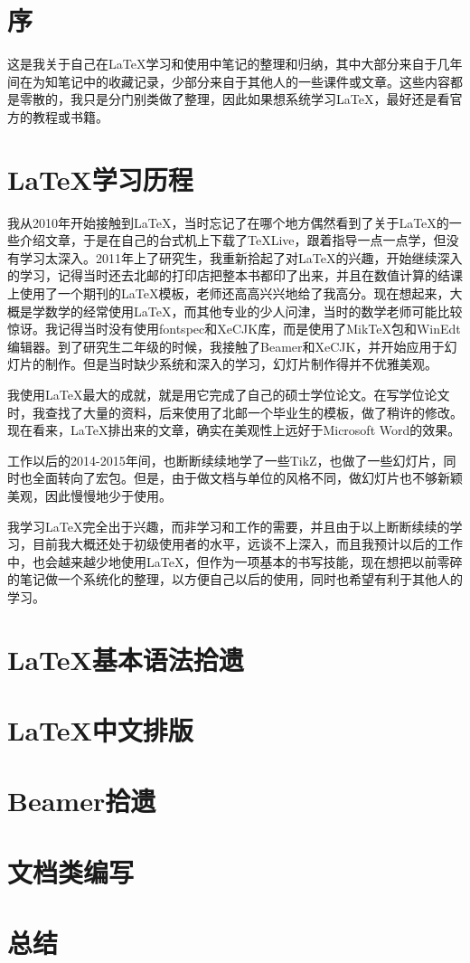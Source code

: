 \documentclass[11pt]{ctexart}
\title{\heiti{\LaTeX 总结}}
\author{\kaishu{北方以北}}
\begin{document}
\maketitle

\tableofcontents

\section{序}

这是我关于自己在\LaTeX 学习和使用中笔记的整理和归纳，其中大部分来自于几年间在为知笔记中的收藏记录，少部分来自于其他人的一些课件或文章。这些内容都是零散的，我只是分门别类做了整理，因此如果想系统学习\LaTeX ，最好还是看官方的教程或书籍。

\section{\LaTeX 学习历程}

我从2010年开始接触到\LaTeX ，当时忘记了在哪个地方偶然看到了关于\LaTeX 的一些介绍文章，于是在自己的台式机上下载了\TeX Live，跟着指导一点一点学，但没有学习太深入。2011年上了研究生，我重新拾起了对\LaTeX 的兴趣，开始继续深入的学习，记得当时还去北邮的打印店把整本书都印了出来，并且在数值计算的结课上使用了一个期刊的\LaTeX 模板，老师还高高兴兴地给了我高分。现在想起来，大概是学数学的经常使用\LaTeX ，而其他专业的少人问津，当时的数学老师可能比较惊讶。我记得当时没有使用fontspec和XeCJK库，而是使用了MikTeX包和WinEdt编辑器。到了研究生二年级的时候，我接触了Beamer和XeCJK，并开始应用于幻灯片的制作。但是当时缺少系统和深入的学习，幻灯片制作得并不优雅美观。

我使用\LaTeX 最大的成就，就是用它完成了自己的硕士学位论文。在写学位论文时，我查找了大量的资料，后来使用了北邮一个毕业生的模板，做了稍许的修改。现在看来，\LaTeX 排出来的文章，确实在美观性上远好于Microsoft Word的效果。

工作以后的2014-2015年间，也断断续续地学了一些TikZ，也做了一些幻灯片，同时也全面转向了\CTeX 宏包。但是，由于做文档与单位的风格不同，做幻灯片也不够新颖美观，因此慢慢地少于使用。


我学习\LaTeX 完全出于兴趣，而非学习和工作的需要，并且由于以上断断续续的学习，目前我大概还处于初级使用者的水平，远谈不上深入，而且我预计以后的工作中，也会越来越少地使用\LaTeX ，但作为一项基本的书写技能，现在想把以前零碎的笔记做一个系统化的整理，以方便自己以后的使用，同时也希望有利于其他人的学习。

\section{\LaTeX 基本语法拾遗}

\section{\LaTeX 中文排版}

\section{Beamer拾遗}

\section{文档类编写}

\section{总结}
\end{document}
